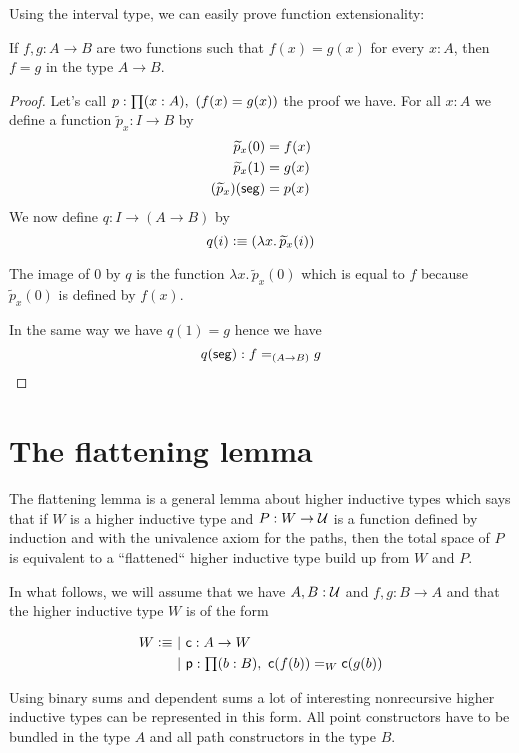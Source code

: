 Using the interval type, we can easily prove function extensionality:

\begin{lem}
  If $f,g:A\to{}B$ are two functions such that $f(x)=g(x)$ for every $x:A$, then
  $f=g$ in the type $A\to{}B$.
\end{lem}

\begin{proof}
  Let’s call $p:\prd{x:A}(f(x)=g(x))$ the proof we have. For all $x:A$ we define
  a function $\widetilde{p}_x:I\to{}B$ by
  \begin{align*}
    \widetilde{p}_x(0) &= f(x) \\
    \widetilde{p}_x(1) &= g(x) \\
    {(\widetilde{p}_x)}\!\left({\mathsf{seg}}\right) &= p(x)
  \end{align*}
  We now define $q:I\to(A\to{}B)$ by
  \[q(i)\vcentcolon\equiv(\lambda{}x.\,\widetilde{p}_x(i))\]

  The image of $0$ by $q$ is the function $\lambda{}x.\,\widetilde{p}_x(0)$
  which is equal to $f$ because $\widetilde{p}_x(0)$ is defined by $f(x)$.

  In the same way we have $q(1)=g$ hence we have
  \[{q}\!\left({\mathsf{seg}}\right):f=_{(A\to{}B)}g\]
\end{proof}

\section{The flattening lemma}
\label{sec:flattening}

The flattening lemma is a general lemma about higher inductive types which says
that if $W$ is a higher inductive type and $P:W\to\mathcal{U}$ is a function defined
by induction and with the univalence axiom for the paths, then the total space
of $P$ is equivalent to a “flattened“ higher inductive type build up from $W$
and $P$.

In what follows, we will assume that we have $A,B:\mathcal{U}$ and $f,g:B\to{}A$ and
that the higher inductive type $W$ is of the form

\newcommand{\cc}{\mathsf{c}}
\newcommand{\pp}{\mathsf{p}}
\newcommand{\cct}{\widetilde{\mathsf{c}}}
\newcommand{\ppt}{\widetilde{\mathsf{p}}}

\begin{align*}
  W \defeq&\ |\ \cc:A\to{}W\\
  &\ |\ \pp:\prd{b:B}\cc(f(b))=_W\cc(g(b))
\end{align*}

Using binary sums and dependent sums a lot of interesting nonrecursive higher
inductive types can be represented in this form. All point constructors have to
be bundled in the type $A$ and all path constructors in the type $B$.

